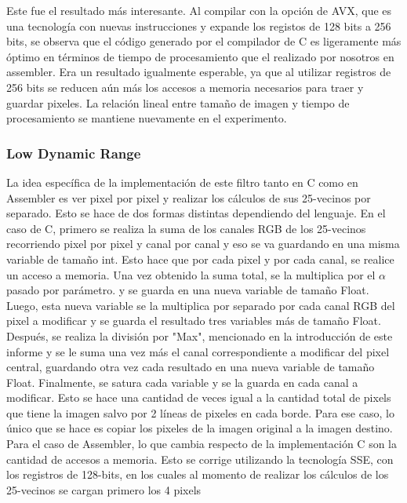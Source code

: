 \documentclass[a4paper]{article}
\begin{document}
Este fue el resultado más interesante. Al compilar con la opción de AVX,
que es una tecnología con nuevas instrucciones y expande los registos de
128 bits a 256 bits, se observa que el código generado por el compilador
de C es ligeramente más óptimo en términos de tiempo de procesamiento que
el realizado por nosotros en assembler. Era un resultado igualmente esperable,
ya que al utilizar registros de 256 bits se reducen aún más los accesos a memoria
necesarios para traer y guardar pixeles. La relación lineal entre tamaño de imagen
y tiempo de procesamiento se mantiene nuevamente en el experimento.

\subsubsection{Low Dynamic Range}
La idea específica de la implementación de este filtro tanto en C como en Assembler es ver pixel por pixel y realizar los cálculos
de sus 25-vecinos por separado. Esto se hace de dos formas distintas dependiendo del lenguaje.
\newline
En el caso de C, primero se realiza la suma de los canales RGB de los 25-vecinos recorriendo pixel por pixel y canal por canal y
eso se va guardando en una misma variable de tamaño int.
Esto hace que por cada pixel y por cada canal, se realice un acceso a memoria. \newline
Una vez obtenido la suma total, se la multiplica por el $\alpha$ pasado por parámetro. y se guarda en una nueva variable de tamaño Float.
Luego, esta nueva variable se la multiplica por separado por cada canal RGB del pixel a modificar y se guarda el resultado tres variables más
de tamaño Float. Después, se realiza la división por "Max", mencionado en la introducción de este informe y se le suma una vez más el canal
correspondiente a modificar del pixel central, guardando otra vez cada resultado en una nueva variable de tamaño Float. Finalmente,
se satura cada variable y se la guarda en cada canal a modificar. Esto se hace una cantidad de veces igual a la cantidad total de pixels
que tiene la imagen salvo por 2 líneas de pixeles en cada borde. Para ese caso, lo único que se hace es copiar los pixeles de la imagen original
a la imagen destino. \newline
Para el caso de Assembler, lo que cambia respecto de la implementación C son la cantidad de accesos a memoria. Esto se corrige utilizando la
tecnología SSE, con los registros de 128-bits, en los cuales al momento de realizar los cálculos de los 25-vecinos se cargan primero los 4 pixels
\end{document}
